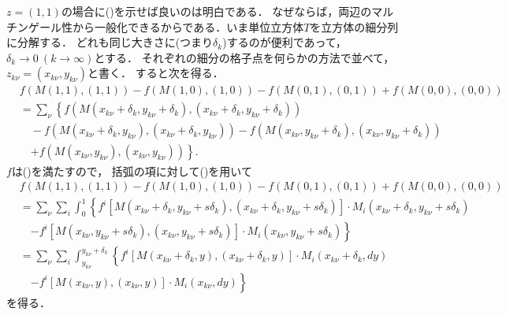 	\begin{prf}
		$z=(1,1)$の場合に()を示せば良いのは明白である．
		なぜならば，両辺のマルチンゲール性から一般化できるからである．いま単位立方体$T$を立方体の細分列に分解する．
		どれも同じ大きさに(つまり$\delta_{k}$)するのが便利であって，$\delta_{k} \longrightarrow 0\ (k \longrightarrow \infty)$とする．
		それぞれの細分の格子点を何らかの方法で並べて，$z_{k\nu}=(x_{k\nu},y_{k\nu})$と書く．
		すると次を得る．
		\begin{align}
			&f(M(1,1),(1,1)) - f(M(1,0),(1,0)) - f(M(0,1),(0,1)) + f(M(0,0),(0,0)) \\
			&= \sum_{\nu} \left\{f(M(x_{k\nu}+\delta_{k}, y_{k\nu}+\delta_{k}),(x_{k\nu}+\delta_{k}, y_{k\nu} + \delta_{k})) \right. \\
			&\quad - f(M(x_{k\nu} + \delta_{k}, y_{k\nu}),(x_{k\nu} + \delta_{k}, y_{k\nu}))
			- f(M(x_{k\nu}, y_{k\nu} + \delta_{k}),(x_{k\nu}, y_{k\nu} + \delta_{k})) \\
			&\quad \left.+ f(M(x_{k\nu}, y_{k\nu}),(x_{k\nu}, y_{k\nu}))\right\}.
		\end{align}
		$f$は()を満たすので，
		括弧の項に対して()を用いて
		\begin{align}
			&f(M(1,1),(1,1)) - f(M(1,0),(1,0)) - f(M(0,1),(0,1)) + f(M(0,0),(0,0)) \\
			&= \sum_{\nu} \sum_{i} \int_{0}^{1} \left\{f^{i}\left[M(x_{k\nu}+\delta_{k}, y_{k\nu}+s\delta_{k}),(x_{k\nu}+\delta_{k}, y_{k\nu} + s\delta_{k})\right] \cdot M_{i}(x_{k\nu}+\delta_{k}, y_{k\nu}+s\delta_{k}) \right. \\
			&\quad \left. - f^{i}\left[M(x_{k\nu}, y_{k\nu}+s\delta_{k}),(x_{k\nu}, y_{k\nu} + s\delta_{k})\right] \cdot M_{i}(x_{k\nu}, y_{k\nu}+s\delta_{k})\right\} \\
			&= \sum_{\nu} \sum_{i} \int_{y_{k\nu}}^{y_{k\nu}+\delta_{k}}
			\left\{f^{i}\left[M(x_{k\nu}+\delta_{k}, y),(x_{k\nu}+\delta_{k}, y)\right] \cdot M_{i}(x_{k\nu}+\delta_{k}, dy) \right. \\
			&\quad \left. - f^{i}\left[M(x_{k\nu}, y),(x_{k\nu}, y)\right] \cdot M_{i}(x_{k\nu}, dy)\right\}
		\end{align}
		を得る．
	\end{prf}